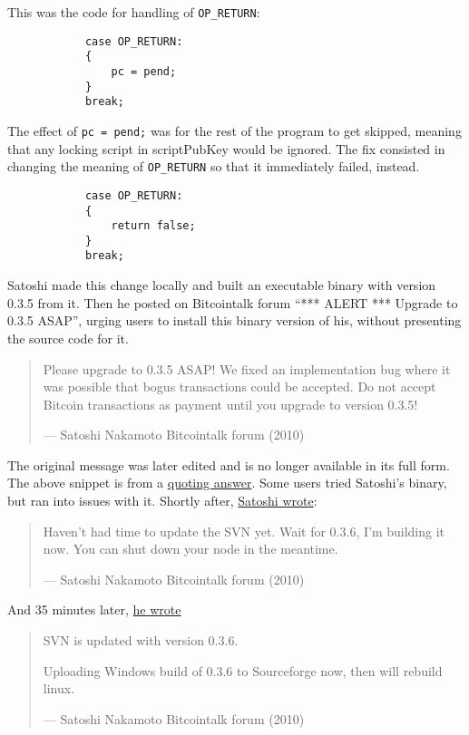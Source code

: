 This was the code for handling of \texttt{OP\_RETURN}:

\begin{verbatim}
            case OP_RETURN:
            {
                pc = pend;
            }
            break;
\end{verbatim}

The effect of \texttt{pc\ =\ pend;} was for the rest of the program to
get skipped, meaning that any locking script in scriptPubKey would be
ignored. The fix consisted in changing the meaning of
\texttt{OP\_RETURN} so that it immediately failed, instead.

\begin{verbatim}
            case OP_RETURN:
            {
                return false;
            }
            break;
\end{verbatim}

Satoshi made this change locally and built an executable binary with
version 0.3.5 from it. Then he posted on Bitcointalk forum ``*** ALERT
*** Upgrade to 0.3.5 ASAP'', urging users to install this binary version
of his, without presenting the source code for it.

\begin{quote}
Please upgrade to 0.3.5 ASAP! We fixed an implementation bug where it
was possible that bogus transactions could be accepted. Do not accept
Bitcoin transactions as payment until you upgrade to version 0.3.5!

---  Satoshi Nakamoto Bitcointalk forum (2010)
\end{quote}

The original message was later edited and is no longer available in its
full form. The above snippet is from a
\href{https://bitcointalk.org/index.php?topic=626.msg6458\#msg6458}{quoting
answer}. Some users tried Satoshi's binary, but ran into issues with it.
Shortly after,
\href{https://bitcointalk.org/index.php?topic=626.msg6469\#msg6469}{Satoshi
wrote}:

\begin{quote}
Haven't had time to update the SVN yet. Wait for 0.3.6, I'm building it
now. You can shut down your node in the meantime.

---  Satoshi Nakamoto Bitcointalk forum (2010)
\end{quote}

And 35 minutes later,
\href{https://bitcointalk.org/index.php?topic=626.msg6480\#msg6480}{he
wrote}

\begin{quote}
SVN is updated with version 0.3.6.

Uploading Windows build of 0.3.6 to Sourceforge now, then will rebuild
linux.

---  Satoshi Nakamoto Bitcointalk forum (2010)
\end{quote}


